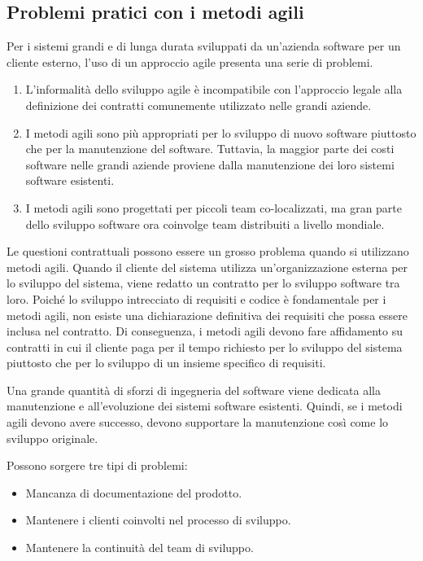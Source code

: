 \subsection{Problemi pratici con i metodi agili}
Per i sistemi grandi e di lunga durata sviluppati da un'azienda software per un cliente esterno, l'uso di un approccio agile presenta una serie di problemi.
\begin{enumerate}
    \item L'informalità dello sviluppo agile è incompatibile con l'approccio legale alla definizione dei contratti comunemente utilizzato nelle grandi aziende.
    \item I metodi agili sono più appropriati per lo sviluppo di nuovo software piuttosto che per la manutenzione del software. Tuttavia, la maggior parte dei costi software nelle grandi aziende proviene dalla manutenzione dei loro sistemi software esistenti.
    \item I metodi agili sono progettati per piccoli team co-localizzati, ma gran parte dello sviluppo software ora coinvolge team distribuiti a livello mondiale.
\end{enumerate}
Le questioni contrattuali possono essere un grosso problema quando si utilizzano metodi agili. Quando il cliente del sistema utilizza un'organizzazione esterna per lo sviluppo del sistema, viene redatto un contratto per lo sviluppo software tra loro. Poiché lo sviluppo intrecciato di requisiti e codice è fondamentale per i metodi agili, non esiste una dichiarazione definitiva dei requisiti che possa essere inclusa nel contratto. Di conseguenza, i metodi agili devono fare affidamento su contratti in cui il cliente paga per il tempo richiesto per lo sviluppo del sistema piuttosto che per lo sviluppo di un insieme specifico di requisiti.

Una grande quantità di sforzi di ingegneria del software viene dedicata alla manutenzione e all'evoluzione dei sistemi software esistenti. Quindi, se i metodi agili devono avere successo, devono supportare la manutenzione così come lo sviluppo originale.

Possono sorgere tre tipi di problemi:
\begin{itemize}
    \item Mancanza di documentazione del prodotto.
    \item Mantenere i clienti coinvolti nel processo di sviluppo.
    \item Mantenere la continuità del team di sviluppo.
\end{itemize}

